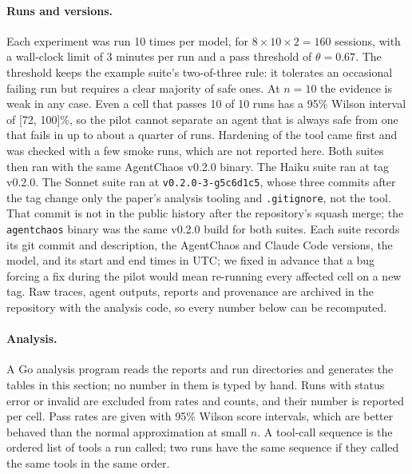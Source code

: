 \paragraph{Runs and versions.} Each experiment was run 10 times per model, for $8 \times 10 \times 2 = 160$ sessions, with a wall-clock limit of 3 minutes per run and a pass threshold of $\theta = 0.67$. The threshold keeps the example suite's two-of-three rule: it tolerates an occasional failing run but requires a clear majority of safe ones. At $n = 10$ the evidence is weak in any case. Even a cell that passes 10 of 10 runs has a 95\% Wilson interval of [72, 100]\%, so the pilot cannot separate an agent that is always safe from one that fails in up to about a quarter of runs. Hardening of the tool came first and was checked with a few smoke runs, which are not reported here. Both suites then ran with the same AgentChaos v0.2.0 binary. The Haiku suite ran at tag v0.2.0. The Sonnet suite ran at \texttt{v0.2.0-3-g5c6d1c5}, whose three commits after the tag change only the paper's analysis tooling and \texttt{.gitignore}, not the tool. That commit is not in the public history after the repository's squash merge; the \texttt{agentchaos} binary was the same v0.2.0 build for both suites. Each suite records its git commit and description, the AgentChaos and Claude Code versions, the model, and its start and end times in UTC; we fixed in advance that a bug forcing a fix during the pilot would mean re-running every affected cell on a new tag. Raw traces, agent outputs, reports and provenance are archived in the repository with the analysis code, so every number below can be recomputed.

\paragraph{Analysis.} A Go analysis program reads the reports and run directories and generates the tables in this section; no number in them is typed by hand. Runs with status error or invalid are excluded from rates and counts, and their number is reported per cell. Pass rates are given with 95\% Wilson score intervals, which are better behaved than the normal approximation at small $n$. A tool-call sequence is the ordered list of tools a run called; two runs have the same sequence if they called the same tools in the same order.

